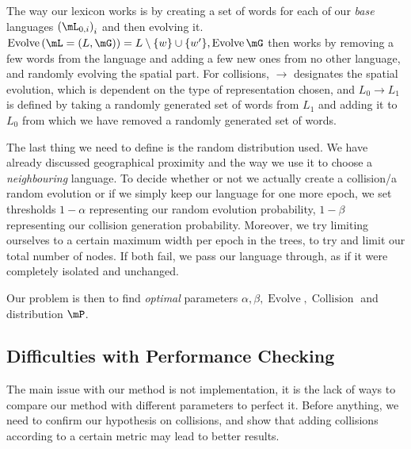 \documentclass[math, info, english]{cours}
\DeclareMathOperator{\revo}{Evolve}
\DeclareMathOperator{\coll}{Collision}
\begin{document}
The way our lexicon works is by creating a set of words for each of our \emph{base} languages $\left(\mL_{0, i}\right)_{i}$ and then evolving it.
$\revo\left( \mL = \left(L, \mG\right) \right) = L \setminus \{w\} \cup \{w'\}, \revo\mG$ then works by removing a few words from the language and adding a few new ones from no other language, and randomly evolving the spatial part.
For collisions, $\to$ designates the spatial evolution, which is dependent on the type of representation chosen, and $L_{0} \to L_{1}$ is defined by taking a randomly generated set of words from $L_{1}$ and adding it to $L_{0}$ from which we have removed a randomly generated set of words.

The last thing we need to define is the random distribution used.
We have already discussed geographical proximity and the way we use it to choose a \emph{neighbouring} language.
To decide whether or not we actually create a collision/a random evolution or if we simply keep our language for one more epoch, we set thresholds $1 - \alpha$ representing our random evolution probability, $1 - \beta$ representing our collision generation probability.
Moreover, we try limiting ourselves to a certain maximum width per epoch in the trees, to try and limit our total number of nodes.
If both fail, we pass our language through, as if it were completely isolated and unchanged.

Our problem is then to find \emph{optimal} parameters $\alpha, \beta, \revo, \coll$ and distribution $\mP$.

\subsection{Difficulties with Performance Checking}
The main issue with our method is not implementation, it is the lack of ways to compare our method with different parameters to perfect it.
Before anything, we need to confirm our hypothesis on collisions, and show that adding collisions according to a certain metric may lead to better results.
\end{document}
